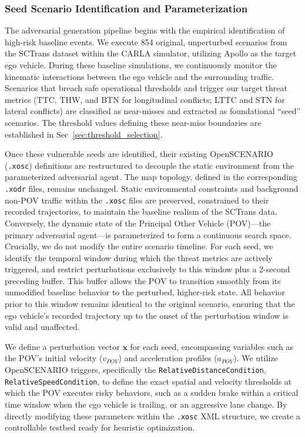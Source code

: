 \subsubsection{Seed Scenario Identification and Parameterization}\label{sec:seed}

The adversarial generation pipeline begins with the empirical identification of high-risk baseline events. We execute 854 original, unperturbed scenarios from the SCTrans dataset within the CARLA simulator, utilizing Apollo as the target ego vehicle. During these baseline simulations, we continuously monitor the kinematic interactions between the ego vehicle and the surrounding traffic. Scenarios that breach safe operational thresholds and trigger our target threat metrics (TTC, THW, and BTN for longitudinal conflicts; LTTC and STN for lateral conflicts) are classified as near-misses and extracted as foundational ``seed'' scenarios. The threshold values defining these near-miss boundaries are established in Sec~\ref{sec:threshold_selection}.

Once these vulnerable seeds are identified, their existing OpenSCENARIO (\texttt{.xosc}) definitions are restructured to decouple the static environment from the parameterized adversarial agent. The map topology, defined in the corresponding \texttt{.xodr} files, remains unchanged. Static environmental constraints and background non-POV traffic within the \texttt{.xosc} files are preserved, constrained to their recorded trajectories, to maintain the baseline realism of the SCTrans data. Conversely, the dynamic state of the Principal Other Vehicle (POV)---the primary adversarial agent---is parameterized to form a continuous search space. Crucially, we do not modify the entire scenario timeline. For each seed, we identify the temporal window during which the threat metrics are actively triggered, and restrict perturbations exclusively to this window plus a 2-second preceding buffer. This buffer allows the POV to transition smoothly from its unmodified baseline behavior to the perturbed, higher-risk state. All behavior prior to this window remains identical to the original scenario, ensuring that the ego vehicle's recorded trajectory up to the onset of the perturbation window is valid and unaffected.

We define a perturbation vector $\mathbf{x}$ for each seed, encompassing variables such as the POV's initial velocity ($v_{POV}$) and acceleration profiles ($a_{POV}$). We utilize OpenSCENARIO triggers, specifically the \texttt{RelativeDistanceCondition}, \texttt{RelativeSpeedCondition}, to define the exact spatial and velocity thresholds at which the POV executes risky behaviors, such as a sudden brake within a critical time window when the ego vehicle is trailing, or an aggressive lane change. By directly modifying these parameters within the \texttt{.xosc} XML structure, we create a controllable testbed ready for heuristic optimization.

